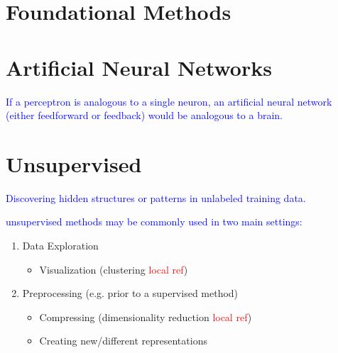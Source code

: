 \chapter{Foundational Methods}















\chapter{Artificial Neural Networks}

\textcolor{blue}{If a perceptron is analogous to a single neuron, an artificial neural network (either feedforward or feedback) would be analogous to a brain.}










\chapter{Unsupervised}

\textcolor{blue}{Discovering hidden structures or patterns in unlabeled training data.}

\textcolor{blue}{unsupervised methods may be commonly used in two main settings:}
\begin{enumerate}
	\item Data Exploration
	\begin{itemize}
		\item Visualization (clustering \textcolor{red}{local ref})
	\end{itemize}
	\item Preprocessing (e.g. prior to a supervised method)
	\begin{itemize}
		\item Compressing (dimensionality reduction \textcolor{red}{local ref})
		\item Creating new/different representations
	\end{itemize}
\end{enumerate}

